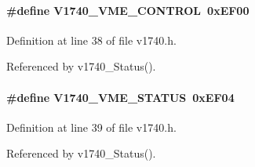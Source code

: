 \paragraph[{V1740\_\-VME\_\-CONTROL}]{\setlength{\rightskip}{0pt plus 5cm}\#define V1740\_\-VME\_\-CONTROL~0xEF00}\hfill\label{v1740_8h_a29eb7a86fe464826b11078efb8da3ff3}


Definition at line 38 of file v1740.h.

Referenced by v1740\_\-Status().
\paragraph[{V1740\_\-VME\_\-STATUS}]{\setlength{\rightskip}{0pt plus 5cm}\#define V1740\_\-VME\_\-STATUS~0xEF04}\hfill\label{v1740_8h_ac50709788b4117c85c329c87a2697e45}


Definition at line 39 of file v1740.h.

Referenced by v1740\_\-Status().
